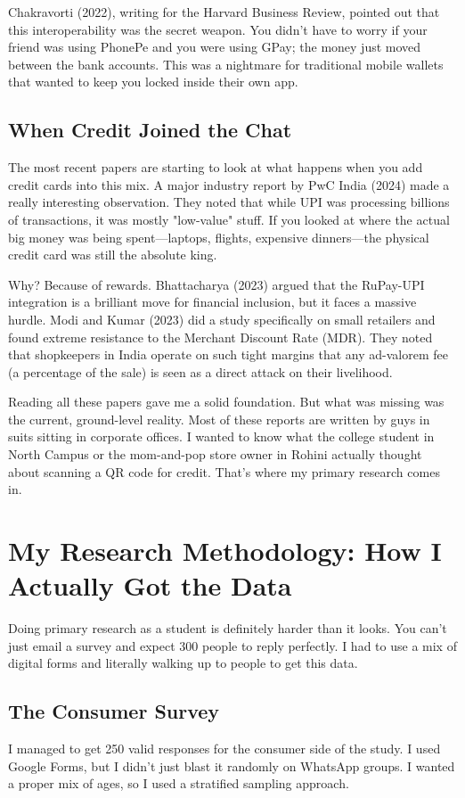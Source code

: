 Chakravorti (2022), writing for the Harvard Business Review, pointed out that this interoperability was the secret weapon. You didn't have to worry if your friend was using PhonePe and you were using GPay; the money just moved between the bank accounts. This was a nightmare for traditional mobile wallets that wanted to keep you locked inside their own app.

\subsection{When Credit Joined the Chat}
The most recent papers are starting to look at what happens when you add credit cards into this mix. A major industry report by PwC India (2024) made a really interesting observation. They noted that while UPI was processing billions of transactions, it was mostly "low-value" stuff. If you looked at where the actual big money was being spent---laptops, flights, expensive dinners---the physical credit card was still the absolute king.

Why? Because of rewards. Bhattacharya (2023) argued that the RuPay-UPI integration is a brilliant move for financial inclusion, but it faces a massive hurdle. Modi and Kumar (2023) did a study specifically on small retailers and found extreme resistance to the Merchant Discount Rate (MDR). They noted that shopkeepers in India operate on such tight margins that any ad-valorem fee (a percentage of the sale) is seen as a direct attack on their livelihood.

Reading all these papers gave me a solid foundation. But what was missing was the current, ground-level reality. Most of these reports are written by guys in suits sitting in corporate offices. I wanted to know what the college student in North Campus or the mom-and-pop store owner in Rohini actually thought about scanning a QR code for credit. That's where my primary research comes in.

\section{My Research Methodology: How I Actually Got the Data}

Doing primary research as a student is definitely harder than it looks. You can't just email a survey and expect 300 people to reply perfectly. I had to use a mix of digital forms and literally walking up to people to get this data.

\subsection{The Consumer Survey}
I managed to get 250 valid responses for the consumer side of the study. I used Google Forms, but I didn't just blast it randomly on WhatsApp groups. I wanted a proper mix of ages, so I used a stratified sampling approach.

